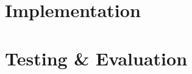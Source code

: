\documentclass[12pt]{article}
\begin{document}
    \section{Implementation}
    \label{sec:implement}
    
    \section{Testing \& Evaluation}
    \label{sec:test_eval}

    \newpage
    
    
    
\end{document}
